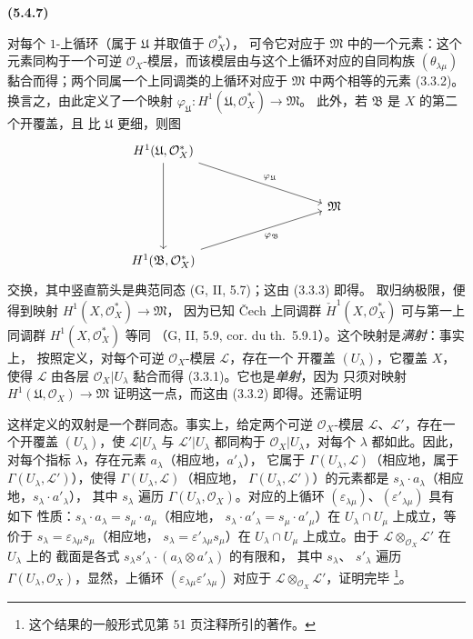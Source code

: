 \documentclass[UTF8,fontset=none,11pt,oneside,openany]{ctexbook}
\newenvironment{env}[1][]{%
  \par\medskip\noindent\textbf{(#1)}\ %
}{\par}
\newcommand{\oldpage}[2][]{%
  \hypertarget{ega-source-page-#1-#2}{}%
  \marginnote{\scriptsize\textbf{#1}~|~#2}\ignorespaces}
\begin{document}
\begin{env}[5.4.7]
对每个 $1$-上循环（属于 $\mathfrak{U}$ 并取值于 $\mathcal{O}_X^*$），
可令它对应于 $\mathfrak{M}$ 中的一个元素：这个元素同构于一个可逆
$\mathcal{O}_X$-模层，而该模层由与这个上循环对应的自同构族
$(\theta_{\lambda\mu})$ 黏合而得；两个同属一个上同调类的上循环对应于
$\mathfrak{M}$ 中两个相等的元素 (3.3.2)。换言之，由此定义了一个映射
$\varphi_{\mathfrak{U}}:H^1(\mathfrak{U},\mathcal{O}_X^*)\to\mathfrak{M}$。
此外，若 $\mathfrak{B}$ 是 $X$ 的第二个开覆盖，且
比 $\mathfrak{U}$ 更细，则图
\[
\begin{tikzcd}[column sep=huge,row sep=large]
H^1(\mathfrak{U},\mathcal{O}_X^*)
  \arrow[dd]
  \arrow[rrd,"\varphi_{\mathfrak{U}}"] & & \\
& & \mathfrak{M} \\
H^1(\mathfrak{B},\mathcal{O}_X^*)
  \arrow[rru,swap,"\varphi_{\mathfrak{B}}"] & &
\end{tikzcd}
\]
交换，其中竖直箭头是典范同态 (G, II, 5.7)；这由 (3.3.3) 即得。
取归纳极限，便得到映射 $H^1(X,\mathcal{O}_X^*)\to\mathfrak{M}$，
因为已知 \v{C}ech 上同调群 $\check{H}^1(X,\mathcal{O}_X^*)$
可与第一上同调群 $H^1(X,\mathcal{O}_X^*)$ 等同
（G, II, 5.9, cor. du th.~5.9.1）。这个映射是\emph{满射}：事实上，
按照定义，对每个可逆 $\mathcal{O}_X$-模层 $\mathcal{L}$，存在一个
开覆盖 $(U_\lambda)$，它覆盖 $X$，使得 $\mathcal{L}$ 由各层
$\mathcal{O}_X|U_\lambda$ 黏合而得 (3.3.1)。它也是\emph{单射}，因为
只须对映射
$H^1(\mathfrak{U},\mathcal{O}_X)\to\mathfrak{M}$ 证明这一点，而这由
(3.3.2) 即得。还需证明

\oldpage[0\textsubscript{I}]{52}

这样定义的双射是一个群同态。事实上，给定两个可逆
$\mathcal{O}_X$-模层 $\mathcal{L}$、$\mathcal{L}'$，存在一个开覆盖
$(U_\lambda)$，使 $\mathcal{L}|U_\lambda$ 与
$\mathcal{L}'|U_\lambda$ 都同构于 $\mathcal{O}_X|U_\lambda$，对每个
$\lambda$ 都如此。因此，对每个指标 $\lambda$，存在元素
$a_\lambda$（相应地，$a'_\lambda$），
它属于 $\Gamma(U_\lambda,\mathcal{L})$（相应地，属于
$\Gamma(U_\lambda,\mathcal{L}')$），使得
$\Gamma(U_\lambda,\mathcal{L})$（相应地，
$\Gamma(U_\lambda,\mathcal{L}')$）的元素都是
$s_\lambda\cdot a_\lambda$（相应地，$s_\lambda\cdot a'_\lambda$），
其中 $s_\lambda$ 遍历 $\Gamma(U_\lambda,\mathcal{O}_X)$。对应的上循环
$(\varepsilon_{\lambda\mu})$、$(\varepsilon'_{\lambda\mu})$ 具有如下
性质：$s_\lambda\cdot a_\lambda=s_\mu\cdot a_\mu$（相应地，
$s_\lambda\cdot a'_\lambda=s_\mu\cdot a'_\mu$）在
$U_\lambda\cap U_\mu$ 上成立，等价于
$s_\lambda=\varepsilon_{\lambda\mu}s_\mu$（相应地，
$s_\lambda=\varepsilon'_{\lambda\mu}s_\mu$）在
$U_\lambda\cap U_\mu$ 上成立。由于
$\mathcal{L}\otimes_{\mathcal{O}_X}\mathcal{L}'$ 在 $U_\lambda$ 上的
截面是各式
$s_\lambda s'_\lambda\cdot(a_\lambda\otimes a'_\lambda)$ 的有限和，
其中 $s_\lambda$、
$s'_\lambda$ 遍历 $\Gamma(U_\lambda,\mathcal{O}_X)$，显然，上循环
$(\varepsilon_{\lambda\mu}\varepsilon'_{\lambda\mu})$ 对应于
$\mathcal{L}\otimes_{\mathcal{O}_X}\mathcal{L}'$，证明完毕
\footnote{这个结果的一般形式见第 51 页注释所引的著作。}。
\end{env}
\end{document}
